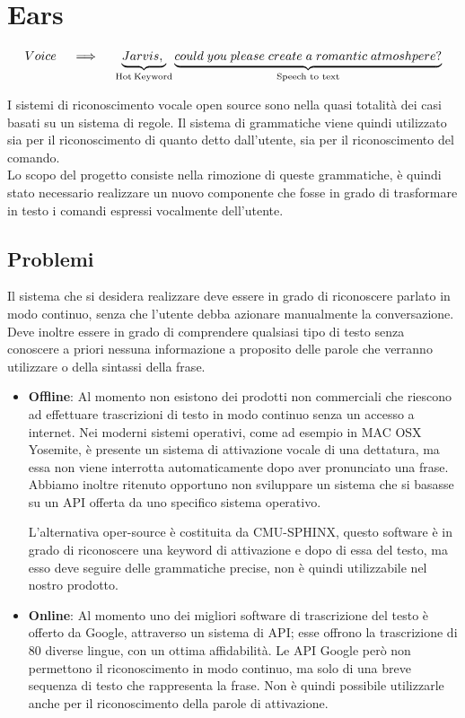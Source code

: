 \documentclass[twoside]{supsistudent}
\begin{document}
\chapter{Ears}
\begin{center}
\[
 Voice \quad\implies\quad
\underbrace{Jarvis,\;}_\text{Hot\:Keyword}
\underbrace{could\;you\;please\;create\;a\;romantic\;atmoshpere?}_\text{Speech to text}
\]
\end{center}
I sistemi di riconoscimento vocale open source sono nella quasi totalità dei casi basati su un sistema di regole. Il sistema di grammatiche viene quindi utilizzato sia per il riconoscimento di quanto detto dall'utente, sia per il riconoscimento del comando.\\
Lo scopo del progetto consiste nella rimozione di queste grammatiche, è quindi stato necessario realizzare un nuovo componente che fosse in grado di trasformare in testo i comandi espressi vocalmente dell'utente.
\section{Problemi}
Il sistema che si desidera realizzare deve essere in grado di riconoscere parlato in modo continuo, senza che l'utente debba azionare manualmente la conversazione. 
Deve inoltre essere in grado di comprendere qualsiasi tipo di testo senza conoscere a priori nessuna informazione a proposito delle parole che verranno utilizzare o della sintassi della frase. 


\begin{itemize}
	\item \textbf{Offline}: Al momento non esistono dei prodotti non commerciali che riescono ad effettuare trascrizioni di testo in modo continuo senza un accesso a internet. Nei moderni sistemi operativi, come ad esempio in MAC OSX Yosemite, è presente un sistema di 		attivazione vocale di una dettatura, ma essa non viene interrotta automaticamente dopo aver pronunciato una frase. Abbiamo inoltre ritenuto opportuno non sviluppare un sistema che si basasse su un API offerta da uno specifico sistema operativo. 
	
	L'alternativa oper-source è costituita da CMU-SPHINX, questo software è in grado di riconoscere una keyword di attivazione e dopo di essa del testo, ma esso deve seguire delle grammatiche precise, non è quindi utilizzabile nel nostro prodotto.\cite{cmusphinx}
	\item \textbf{Online}: Al momento uno dei migliori software di trascrizione del testo è offerto da Google, attraverso un sistema di API; esse offrono la trascrizione di 80 diverse lingue, con un ottima affidabilità.
		Le API Google però non permettono il riconoscimento in modo continuo, ma solo di una breve sequenza di testo che rappresenta la frase.
		Non è quindi possibile utilizzarle anche per il riconoscimento della parole di attivazione.
\end{itemize}
\end{document}
